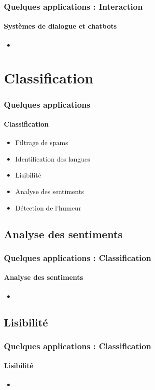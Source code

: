 \documentclass[xcolor=table]{beamer}
\begin{document}
\begin{frame}
	\frametitle{Quelques applications : Interaction}
	\framesubtitle{Systèmes de dialogue et chatbots}
	\begin{itemize}
		\item 
	\end{itemize}
\end{frame}


\section{Classification}

\begin{frame}
	\frametitle{Quelques applications}
	\framesubtitle{Classification}
	\begin{itemize}
		\item Filtrage de spams
		\item Identification des langues
		\item Lisibilité 
		\item Analyse des sentiments
		\item Détection de l'humeur
	\end{itemize}
\end{frame}

\subsection{Analyse des sentiments}

\begin{frame}
	\frametitle{Quelques applications : Classification}
	\framesubtitle{Analyse des sentiments}
	\begin{itemize}
		\item 
	\end{itemize}
\end{frame}

\subsection{Lisibilité}

\begin{frame}
	\frametitle{Quelques applications : Classification}
	\framesubtitle{Lisibilité}
	\begin{itemize}
		\item 
	\end{itemize}
\end{frame}
\end{document}

